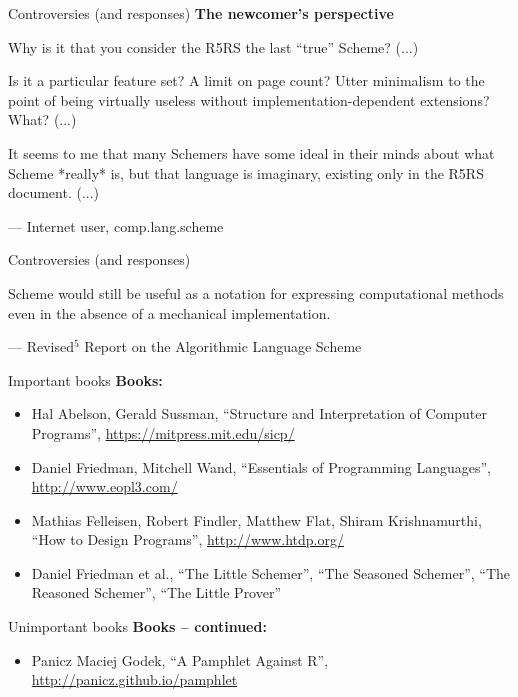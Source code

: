 \documentclass{beamer}
\begin{document}
\begin{frame}{Controversies (and responses)}
  \textbf{The newcomer's perspective}
  \begin{displayquote}
    Why is it that you consider the R5RS the last ``true'' Scheme? (...)

    Is it a particular feature set?  A limit on page count?
    Utter minimalism to the point of being virtually useless without
    implementation-dependent extensions?  What? (...)

    It seems to me that many Schemers have some ideal in their minds about
    what Scheme *really* is, but that language is imaginary, existing only
    in the R5RS document. (...)
  \end{displayquote}
  --- Internet user, comp.lang.scheme
\end{frame}


\begin{frame}{Controversies (and responses)}
  \begin{displayquote}
    Scheme would still be useful as a notation for expressing
    computational methods even in the absence of a mechanical
    implementation.
  \end{displayquote}
  --- Revised$^5$ Report on the Algorithmic Language Scheme
\end{frame}

\begin{frame}{Important books}
  \textbf{Books:}
  \begin{itemize}
    \pause
  \item Hal Abelson, Gerald Sussman, ``Structure and Interpretation of Computer Programs'', \url{https://mitpress.mit.edu/sicp/}
    \pause
  \item Daniel Friedman, Mitchell Wand, ``Essentials of Programming Languages'', \url{http://www.eopl3.com/}
    \pause
  \item Mathias Felleisen, Robert Findler, Matthew Flat, Shiram Krishnamurthi, ``How to Design Programs'', \url{http://www.htdp.org/}
    \pause
  \item Daniel Friedman et al., ``The Little Schemer'', ``The Seasoned Schemer'',  ``The Reasoned Schemer'', ``The Little Prover''
  \end{itemize}
\end{frame}

\begin{frame}{Unimportant books}
  \textbf{Books -- continued:}
  \begin{itemize}
    \pause
  \item Panicz Maciej Godek, ``A Pamphlet Against R'', \url{http://panicz.github.io/pamphlet}
  \end{itemize}
\end{frame}
\end{document}
